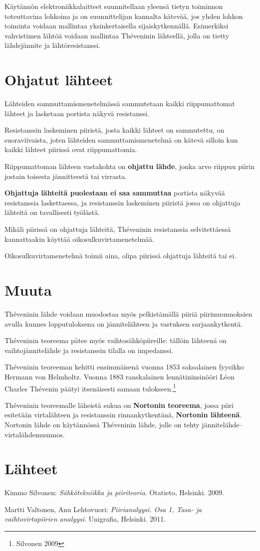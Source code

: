 \documentclass[]{article}
\begin{document}
Käytännön elektroniikkalaitteet suunnitellaan yleensä tietyn toiminnon toteuttavina lohkoina ja on suunnittelijan kannalta kätevää, jos yhden lohkon toiminta voidaan mallintaa yksinkertaisella sijaiskytkennällä. Esimerkiksi vahvistimen lähtöä voidaan mallintaa Théveninin lähteellä, jolla on tietty lähdejännite ja lähtöresistanssi.

\section{Ohjatut lähteet}\label{ohjatut}

Lähteiden sammuttamismenetelmässä sammutetaan kaikki riippumattomat lähteet ja lasketaan portista näkyvä resistanssi.

Resistanssin laskeminen piiristä, josta kaikki lähteet on sammutettu, on suoraviivaista, joten lähteiden sammuttamismenetelmä on kätevä silloin kun kaikki lähteet piirissä ovat riippumattomia.

Riippumattoman lähteen vastakohta on {\bf ohjattu lähde}, jonka arvo riippuu piirin jostain toisesta jännitteestä tai virrasta.

{\bf Ohjattuja lähteitä puolestaan ei saa sammuttaa} portista näkyvää resistanssia laskettaessa, ja resistanssin laskeminen piiristä jossa on ohjattuja lähteitä on tavallisesti työlästä.

Mikäli piirissä on ohjattuja lähteitä, Théveninin resistanssia selvitettäessä kannattaakin käyttää oikosulkuvirtamenetelmää.

Oikosulkuvirtamenetelmä toimii aina, olipa piirissä ohjattuja lähteitä tai ei.

\section{Muuta}

Théveninin lähde voidaan muodostaa myös pelkistämällä piiriä piirimuunnoksien avulla kunnes lopputuloksena on jännitelähteen ja vastuksen sarjaankytkentä.

Théveninin teoreema pätee myös vaihtosähköpiireille: tällöin lähteenä on vaihtojännitelähde ja resistanssin tilalla on impedanssi.

Théveninin teoreeman kehitti ensimmäisenä vuonna 1853 saksalainen fyysikko Hermann von Helmholtz. Vuonna 1883 ranskalainen lennätininsinööri Léon Charles Thévenin päätyi itsenäisesti samaan tulokseen.\footnote{Silvonen 2009}

Théveninin teoreemalle läheistä sukua on {\bf Nortonin teoreema}, jossa piiri esitetään virtalähteen ja resistanssin rinnankytkentänä, {\bf Nortonin lähteenä}. Nortonin lähde on käytännössä Théveninin lähde, jolle on tehty jännitelähde--virtalähdemuunnos.


\section{Lähteet}

Kimmo Silvonen: {\em Sähkötekniikka ja piiriteoria}. Otatieto, Helsinki. 2009.

Martti Valtonen, Anu Lehtovuori: {\em Piirianalyysi. Osa 1, Tasa- ja vaihtovirtapiirien analyysi}. Unigrafia, Helsinki. 2011.
\end{document}
